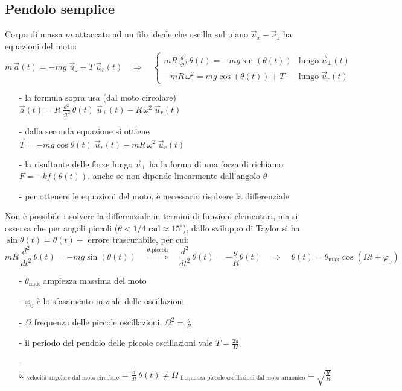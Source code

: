 \documentclass[a4paper]{article}
\newcommand\ux{\vec{u}_x}
\newcommand\uz{\vec{u}_z}
\newcommand\ur{\vec{u}_r}
\newcommand\uper{\vec{u}_\perp}
\newcommand\dt{\frac{d}{dt}\,}
\newcommand\dts{\frac{d^2}{dt^2}\,}
\begin{document}
\subsection{Pendolo semplice}
Corpo di massa \(m\) attaccato ad un filo ideale che oscilla sul piano \(\ux - \uz\) ha equazioni del moto:
\[m \, \vec{a}(t) = - mg \; \uz - T \; \ur(t) \quad \Rightarrow \quad \begin{cases}
	\displaystyle mR  \, \dts \theta(t) = -mg \sin (\theta(t)) &\text{lungo} \; \uper(t) \\
	\displaystyle -mR \, \omega^2 = mg \cos (\theta(t)) + T &\text{lungo} \; \ur(t)
\end{cases}\]
\begin{itemize}[topsep=3pt, itemsep=0pt]
	\item[-] la formula sopra usa (dal moto circolare) \(\vec{a}(t) = R \, \dts \theta(t) \; \uper(t) - R \, \omega^2 \; \ur(t)\)
	\item[-] dalla seconda equazione si ottiene \(\vec{T} = -mg \cos \theta(t) \; \ur(t) - mR \, \omega^2 \; \ur(t)\)
	\item[-] la risultante delle forze lungo \(\uper\) ha la forma di una forza di richiamo \(F = -k f(\theta(t))\), anche se non
	dipende linearmente dall'angolo \(\theta\)
	\item[-] per ottenere le equazioni del moto, è necessario risolvere la differenziale
\end{itemize}
Non è possibile risolvere la differenziale in termini di funzioni elementari, ma si osserva che per angoli piccoli (\(\theta < 1/4 \; \text{rad} \approx 15^\circ\)),
dallo sviluppo di Taylor si ha \(\sin \theta(t) = \theta(t) + \!\) errore trascurabile, per cui:
\[mR  \, \dts \theta(t) = -mg \sin (\theta(t)) \quad \stackrel{\theta \; \text{piccoli}}{\Rightarrow} \quad \dts \theta(t) = -\frac{g}{R} \theta(t) \quad \Rightarrow \quad \theta(t) = \theta_\text{max} \cos(\Omega t + \varphi_0)\]
\begin{itemize}[topsep=3pt, itemsep=0pt]
	\item[-] \(\theta_\text{max}\) ampiezza massima del moto
	\item[-] \(\varphi_0\) è lo sfasamento iniziale delle oscillazioni
	\item[-] \(\Omega\) frequenza delle piccole oscillazioni, \(\displaystyle \Omega^2 = \frac{g}{R}\)
	\item[-] il periodo del pendolo delle piccole oscillazioni vale \(\displaystyle T = \frac{2\pi}{\Omega}\)
	\item[-] \(\omega \; _\text{velocità angolare dal moto circolare} = \dt \theta(t) \neq \Omega \; _\text{frequenza piccole oscillazioni dal moto armonico} = \sqrt{\frac{g}{R}}\)
\end{itemize}
\end{document}
